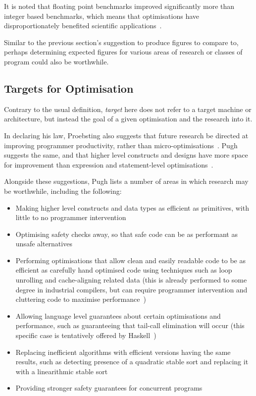It is noted that floating point benchmarks improved significantly more than integer based benchmarks, which means that optimisations have disproportionately benefited scientific applications~\cite{proebstingformal}.

Similar to the previous section's suggestion to produce figures to compare to, perhaps determining expected figures for various areas of research or classes of program could also be worthwhile.

\subsection{Targets for Optimisation}

Contrary to the usual definition, \textit{target} here does not refer to a target machine or architecture, but instead the goal of a given optimisation and the research into it.

In declaring his law, Proebsting also suggests that future research be directed at improving programmer productivity, rather than micro-optimisations~\cite{proebstingdecl}. Pugh suggests the same, and that higher level constructs and designs have more space for improvement than expression and statement-level optimisations~\cite{optimisationrelevant}.

Alongside these suggestions, Pugh lists a number of areas in which research may be worthwhile, including the following:

\begin{itemize}
	\itemsep-0.25em
	\item Making higher level constructs and data types as efficient as primitives, with little to no programmer intervention
	\item Optimising safety checks away, so that safe code can be as performant as unsafe alternatives
	\item Performing optimisations that allow clean and easily readable code to be as efficient as carefully hand optimised code using techniques such as loop unrolling and cache-aligning related data (this is already performed to some degree in industrial compilers, but can require programmer intervention and cluttering code to maximise performance~\cite{gccloops})
	\item Allowing language level guarantees about certain optimisations and performance, such as guaranteeing that tail-call elimination will occur (this specific case is tentatively offered by Haskell~\cite{haskelltail})
	\item Replacing inefficient algorithms with efficient versions having the same results, such as detecting presence of a quadratic stable sort and replacing it with a linearithmic stable sort
	\item Providing stronger safety guarantees for concurrent programs
\end{itemize}


